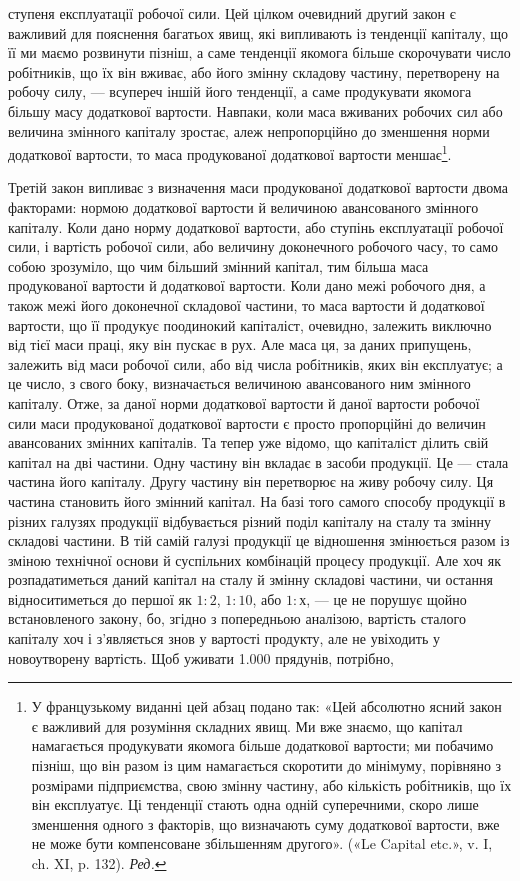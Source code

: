 \parcont{}  %
ступеня експлуатації робочої сили. Цей цілком очевидний другий
закон є важливий для пояснення багатьох явищ, які випливають
із тенденції капіталу, що її ми маємо розвинути пізніш,
а саме тенденції якомога більше скорочувати число робітників,
що їх він вживає, або його змінну складову частину, перетворену
на робочу силу, — всупереч іншій його тенденції, а саме продукувати
якомога більшу масу додаткової вартости. Навпаки, коли
маса вживаних робочих сил або величина змінного капіталу
зростає, алеж непропорційно до зменшення норми додаткової
вартости, то маса продукованої додаткової вартости меншає\footnote*{
У французькому виданні цей абзац подано так: «Цей абсолютно
ясний закон є важливий для розуміння складних явищ. Ми вже знаємо,
що капітал намагається продукувати якомога більше додаткової вартости;
ми побачимо пізніш, що він разом із цим намагається скоротити до
мінімуму, порівняно з розмірами підприємства, свою змінну частину,
або кількість робітників, що їх він експлуатує. Ці тенденції стають одна
одній суперечними, скоро лише зменшення одного з факторів, що визначають
суму додаткової вартости, вже не може бути компенсоване збільшенням
другого». («Le Capital etc.», v. I, ch. XI, p. 132). \emph{Ред.}
}.

Третій закон випливає з визначення маси продукованої додаткової
вартости двома факторами: нормою додаткової вартости й
величиною авансованого змінного капіталу. Коли дано норму
додаткової вартости, або ступінь експлуатації робочої сили,
і вартість робочої сили, або величину доконечного робочого
часу, то само собою зрозуміло, що чим більший змінний капітал,
тим більша маса продукованої вартости й додаткової вартости.
Коли дано межі робочого дня, а також межі його доконечної
складової частини, то маса вартости й додаткової вартости,
що її продукує поодинокий капіталіст, очевидно, залежить
виключно від тієї маси праці, яку він пускає в рух. Але
маса ця, за даних припущень, залежить від маси робочої сили,
або від числа робітників, яких він експлуатує; а це число, з
свого боку, визначається величиною авансованого ним змінного
капіталу. Отже, за даної норми додаткової вартости й даної вартости
робочої сили маси продукованої додаткової вартости є
просто пропорційні до величин авансованих змінних капіталів.
Та тепер уже відомо, що капіталіст ділить свій капітал на
дві частини. Одну частину він вкладає в засоби продукції. Це —
стала частина його капіталу. Другу частину він перетворює на
живу робочу силу. Ця частина становить його змінний капітал.
На базі того самого способу продукції в різних галузях продукції
відбувається різний поділ капіталу на сталу та змінну складові
частини. В тій самій галузі продукції це відношення змінюється
разом із зміною технічної основи й суспільних комбінацій процесу
продукції. Але хоч як розпадатиметься даний капітал на сталу
й змінну складові частини, чи остання відноситиметься до першої
як $1 : 2$, $1 : 10$, або $1 : х$, — це не порушує щойно встановленого
закону, бо, згідно з попередньою аналізою, вартість сталого капіталу
хоч і з’являється знов у вартості продукту, але не увіходить
у новоутворену вартість. Щоб уживати \num{1.000} прядунів, потрібно,
\parbreak{}  %
